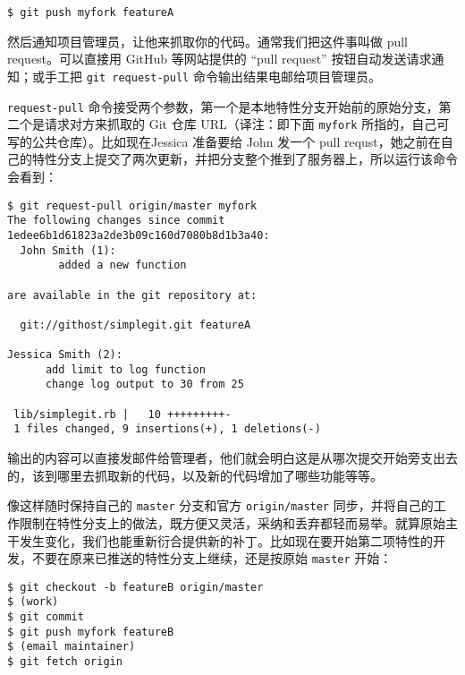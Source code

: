 \documentclass[a4paper]{book}
\begin{document}
\begin{shaded}\begin{verbatim}
$ git push myfork featureA
\end{verbatim}\end{shaded}

然后通知项目管理员，让他来抓取你的代码。通常我们把这件事叫做 pull request。可以直接用 GitHub 等网站提供的 “pull request” 按钮自动发送请求通知；或手工把 \texttt{git request-pull} 命令输出结果电邮给项目管理员。

\texttt{request-pull} 命令接受两个参数，第一个是本地特性分支开始前的原始分支，第二个是请求对方来抓取的 Git 仓库 URL（译注：即下面 \texttt{myfork} 所指的，自己可写的公共仓库）。比如现在Jessica 准备要给 John 发一个 pull requst，她之前在自己的特性分支上提交了两次更新，并把分支整个推到了服务器上，所以运行该命令会看到：

\begin{shaded}\begin{verbatim}
$ git request-pull origin/master myfork
The following changes since commit 1edee6b1d61823a2de3b09c160d7080b8d1b3a40:
  John Smith (1):
        added a new function

are available in the git repository at:

  git://githost/simplegit.git featureA

Jessica Smith (2):
      add limit to log function
      change log output to 30 from 25

 lib/simplegit.rb |   10 +++++++++-
 1 files changed, 9 insertions(+), 1 deletions(-)
\end{verbatim}\end{shaded}

输出的内容可以直接发邮件给管理者，他们就会明白这是从哪次提交开始旁支出去的，该到哪里去抓取新的代码，以及新的代码增加了哪些功能等等。

像这样随时保持自己的 \texttt{master} 分支和官方 \texttt{origin/master} 同步，并将自己的工作限制在特性分支上的做法，既方便又灵活，采纳和丢弃都轻而易举。就算原始主干发生变化，我们也能重新衍合提供新的补丁。比如现在要开始第二项特性的开发，不要在原来已推送的特性分支上继续，还是按原始 \texttt{master} 开始：

\begin{shaded}\begin{verbatim}
$ git checkout -b featureB origin/master
$ (work)
$ git commit
$ git push myfork featureB
$ (email maintainer)
$ git fetch origin
\end{verbatim}\end{shaded}
\end{document}
